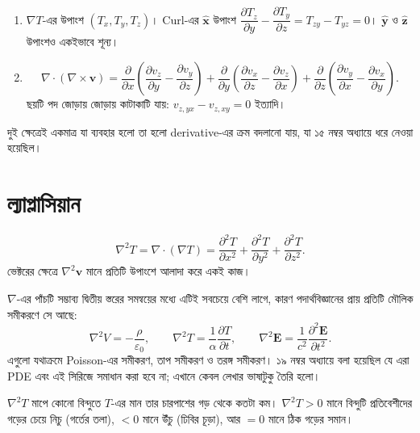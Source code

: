 \documentclass[11pt]{article}
\begin{document}
\begin{sol}
\begin{enumerate}
  \item $\nabla T$-এর উপাংশ $\left( T_{x}, T_{y}, T_{z} \right)$। Curl-এর
        $\hat{\mathbf{x}}$ উপাংশ
        $\dfrac{\partial T_{z}}{\partial y} - \dfrac{\partial T_{y}}
        {\partial z} = T_{zy} - T_{yz} = 0$।
        $\hat{\mathbf{y}}$ ও $\hat{\mathbf{z}}$ উপাংশও একইভাবে শূন্য।
  \item \[
          \nabla\cdot(\nabla\times\mathbf{v})
          = \frac{\partial}{\partial x}\left( \frac{\partial v_{z}}{\partial y}
          - \frac{\partial v_{y}}{\partial z} \right)
          + \frac{\partial}{\partial y}\left( \frac{\partial v_{x}}{\partial z}
          - \frac{\partial v_{z}}{\partial x} \right)
          + \frac{\partial}{\partial z}\left( \frac{\partial v_{y}}{\partial x}
          - \frac{\partial v_{x}}{\partial y} \right) .
        \]
        ছয়টি পদ জোড়ায় জোড়ায় কাটাকাটি যায়:
        $v_{z,yx} - v_{z,xy} = 0$ ইত্যাদি।
\end{enumerate}
দুই ক্ষেত্রেই একমাত্র যা ব্যবহার হলো তা হলো derivative-এর ক্রম বদলানো যায়,
যা ১৫ নম্বর অধ্যায়ে ধরে নেওয়া হয়েছিল।
\end{sol}

\section{ল্যাপ্লাসিয়ান}

\begin{idea}[Laplacian]
\[
  \nabla^{2}T = \nabla\cdot(\nabla T)
  = \frac{\partial^{2}T}{\partial x^{2}}
  + \frac{\partial^{2}T}{\partial y^{2}}
  + \frac{\partial^{2}T}{\partial z^{2}} .
\]
ভেক্টরের ক্ষেত্রে $\nabla^{2}\mathbf{v}$ মানে প্রতিটি উপাংশে আলাদা করে একই
কাজ।
\end{idea}

$\nabla$-এর পাঁচটি সম্ভাব্য দ্বিতীয় স্তরের সমন্বয়ের মধ্যে এটিই সবচেয়ে
বেশি লাগে, কারণ পদার্থবিজ্ঞানের প্রায় প্রতিটি মৌলিক সমীকরণে সে আছে:
\[
  \nabla^{2}V = -\frac{\rho}{\varepsilon_{0}}, \qquad
  \nabla^{2}T = \frac{1}{\alpha}\frac{\partial T}{\partial t}, \qquad
  \nabla^{2}\mathbf{E} = \frac{1}{c^{2}}
  \frac{\partial^{2}\mathbf{E}}{\partial t^{2}} .
\]
এগুলো যথাক্রমে Poisson-এর সমীকরণ, তাপ সমীকরণ ও তরঙ্গ সমীকরণ। ১৯ নম্বর
অধ্যায়ে বলা হয়েছিল যে এরা PDE এবং এই সিরিজে সমাধান করা হবে না; এখানে
কেবল লেখার ভাষাটুকু তৈরি হলো।

\begin{idea}[অর্থ]
$\nabla^{2}T$ মাপে কোনো বিন্দুতে $T$-এর মান তার চারপাশের গড় থেকে কতটা কম।
$\nabla^{2}T > 0$ মানে বিন্দুটি প্রতিবেশীদের গড়ের চেয়ে নিচু (গর্তের তলা),
$< 0$ মানে উঁচু (ঢিবির চূড়া), আর $= 0$ মানে ঠিক গড়ের সমান।
\end{idea}
\end{document}
